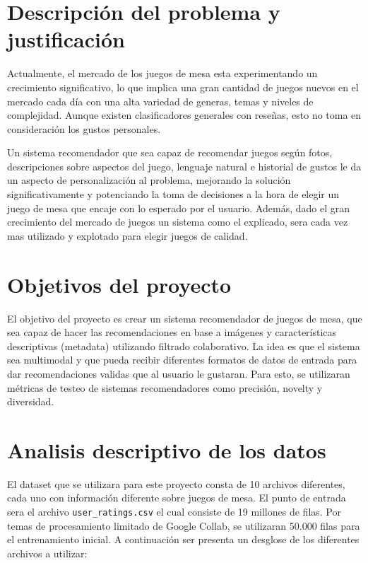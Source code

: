 \documentclass[11pt]{article}
\begin{document}
\section{Descripción del problema y justificación}
Actualmente, el mercado de los juegos de mesa esta experimentando un crecimiento significativo, lo que implica una gran cantidad de juegos nuevos en el mercado cada día con una alta variedad de generas, temas y niveles de complejidad. Aunque existen clasificadores generales con reseñas, esto no toma en consideración los gustos personales. 

Un sistema recomendador que sea capaz de recomendar juegos según fotos, descripciones sobre aspectos del juego, lenguaje natural e historial de gustos le da un aspecto de personalización al problema, mejorando la solución significativamente y potenciando la toma de decisiones a la hora de elegir un juego de mesa que encaje con lo esperado por el usuario. Además, dado el gran crecimiento del mercado de juegos un sistema como el explicado, sera cada vez mas utilizado y explotado para elegir juegos de calidad.

\section{Objetivos del proyecto}
El objetivo del proyecto es crear un sistema recomendador de juegos de mesa, que sea capaz de hacer las recomendaciones en base a imágenes y características descriptivas (metadata) utilizando filtrado colaborativo. La idea es que el sistema sea multimodal y que pueda recibir diferentes formatos de datos de entrada para dar recomendaciones validas que al usuario le gustaran. Para esto, se utilizaran métricas de testeo de sistemas recomendadores como precisión, novelty y diversidad.

\section{Analisis descriptivo de los datos}
El dataset que se utilizara para este proyecto consta de 10 archivos diferentes, cada uno con información diferente sobre juegos de mesa. El punto de entrada sera el archivo \texttt{user\_ratings.csv} el cual consiste de 19 millones de filas. Por temas de procesamiento limitado de Google Collab, se utilizaran 50.000 filas para el entrenamiento  inicial. A continuación ser presenta un desglose de los diferentes archivos a utilizar:
\end{document}
